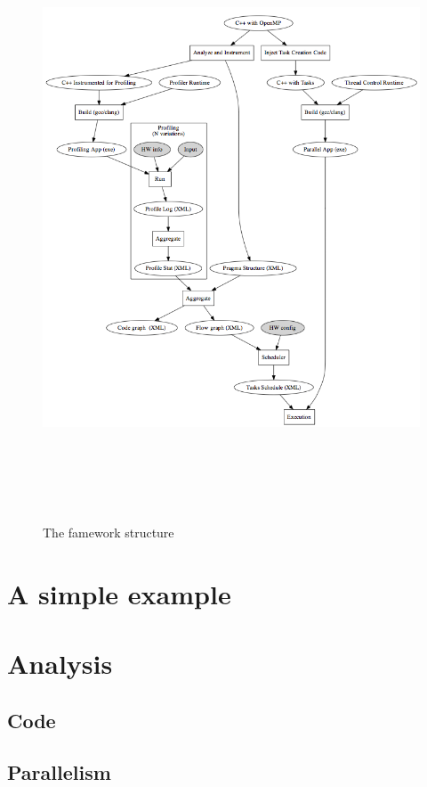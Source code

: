 \documentclass[a4paper,11pt,oneside]{book}
\begin{document}
\begin{figure}[ht!]
\centering
\includegraphics[width = 160mm, height = 180mm]{framework.png}
\caption{The famework structure}
\label{framework}
\end{figure}


\section{A simple example}
\section{Analysis}
\subsection{Code}
\subsection{Parallelism}
\end{document}
